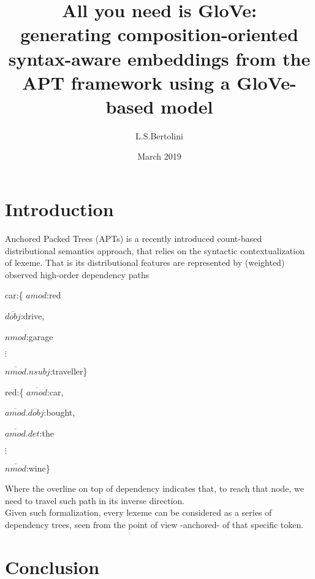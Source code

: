 \documentclass{article}
\title{All you need is GloVe: \\ generating composition-oriented syntax-aware embeddings from the APT framework using a GloVe-based model}
\author{L.S.Bertolini}
\date{March 2019}
\begin{document}
\maketitle

\section{Introduction}
Anchored Packed Trees (APTs) is a recently introduced count-based
distributional semantics approach, that relies on the syntactic
contextualization of lexeme. That is its distributional features are 
represented by (weighted) observed high-order 
dependency 
paths
\newline
\newline
\begin{varwidth}[t]{.5\textwidth}
\begin{description}
\item car:\{ $\textit{amod}$:red
\begin{description}
\item$\overline{dobj}$:drive,
\item$\textit{nmod}$:garage
\item$\vdots$
\item$\overline{nmod}$.$\textit{nsubj}$:traveller\} %
\end{description}
\end{description}
\end{varwidth}%
\hspace{4em}%
\begin{varwidth}[t]{.5\textwidth}
\begin{description}
\item red:\{ $\overline{amod}$:car,
\begin{description}
\item$\overline{amod}$.$\overline{dobj}$:bought,
\item$\overline{amod}$.$\textit{det}$:the
\item$\vdots$
\item$\overline{nmod}$:wine\}
\end{description}
\end{description}
\end{varwidth}\newline
\newline
\newline
Where the overline on top of dependency indicates that, to reach that node, 
we need to travel such path in its inverse direction.\\
Given such formalization, every lexeme can be considered as a series of 
dependency trees, seen from the point of view -anchored- of that specific 
token. 

\section{Conclusion}
\end{document}
